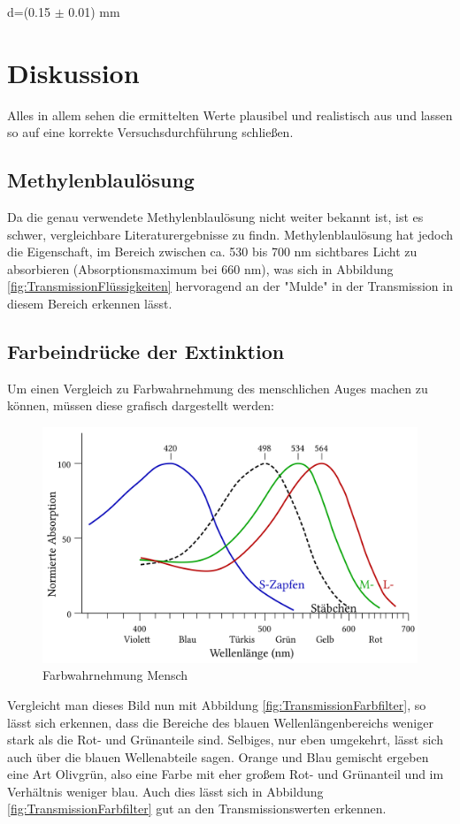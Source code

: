 \documentclass[12pt,a4paper,twoside]{article}
\begin{document}
\noindent
d=(0.15 $\pm$ 0.01) mm




\section{Diskussion} %

Alles in allem sehen die ermittelten Werte plausibel und realistisch aus und lassen so auf eine korrekte Versuchsdurchführung schließen.

\subsection{Methylenblaulösung}
Da die genau verwendete Methylenblaulösung nicht weiter bekannt ist, ist es schwer, vergleichbare Literaturergebnisse zu findn.
Methylenblaulösung hat jedoch die Eigenschaft, im Bereich zwischen ca. 530 bis 700 nm sichtbares Licht zu absorbieren (Absorptionsmaximum bei 660 nm), was sich in Abbildung \ref{fig:TransmissionFlüssigkeiten} hervoragend an der "Mulde" in der Transmission in diesem Bereich erkennen lässt.
\cite{Methylenblau}

\subsection{Farbeindrücke der Extinktion}
Um einen Vergleich zu Farbwahrnehmung des menschlichen Auges machen zu können, müssen diese grafisch dargestellt werden:

\begin{figure}[H]
    \centering
    \includegraphics[width=0.5\linewidth]{nudes/Farbwahrnehmung des menschlichen Auges.png}
    \caption{Farbwahrnehmung Mensch \cite{Farbwahrnehmung}}
    \label{fig:FarbwahrnehmungMensch}
\end{figure}

\noindent
Vergleicht man dieses Bild nun mit Abbildung \ref{fig:TransmissionFarbfilter}, so lässt sich erkennen, dass die Bereiche des blauen Wellenlängenbereichs weniger stark als die Rot- und Grünanteile sind. Selbiges, nur eben umgekehrt, lässt sich auch über die blauen Wellenabteile sagen.
Orange und Blau gemischt ergeben eine Art Olivgrün, also eine Farbe mit eher großem Rot- und Grünanteil und im Verhältnis weniger blau. Auch dies lässt sich in Abbildung \ref{fig:TransmissionFarbfilter} gut an den Transmissionswerten erkennen. \newline
\end{document}
